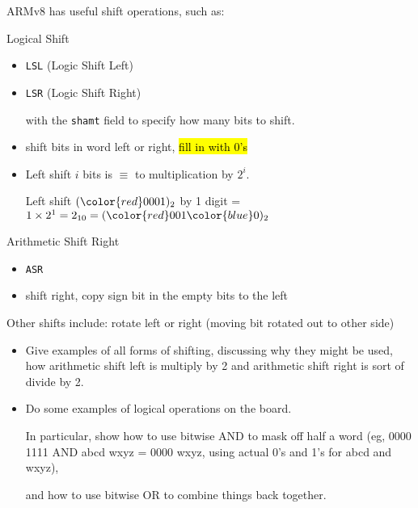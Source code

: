 \begin{frame}[fragile]
ARMv8 has useful shift operations, such as:
\begin{multicols}{2}
Logical Shift 
{\small
\begin{itemize}
\item \texttt{LSL} (Logic Shift Left)
\item \texttt{LSR} (Logic Shift Right)

with the \texttt{shamt} field to specify how many bits to shift.

    \item shift bits in word left or right, \hl{fill in with 0's}
    
\item Left shift $i$ bits is $\equiv$ to multiplication by $2^i$. 

Left shift $({\color{red}0001})_2$ by 1 digit = $ 1 \times 2^1 = 2_{10} =  ({\color{red}001}{\color{blue}0})_2$
\end{itemize}
}
\columnbreak

Arithmetic Shift Right
{\small
\begin{itemize}
\item \texttt{ASR}
\item shift right, copy sign bit in the empty bits to the left 
    \end{itemize}
    }
Other shifts include: rotate left or right (moving bit rotated out to other side)
\end{multicols}


\BNotes\ifnum{}
\begin{itemize}
\item Give examples of all forms of shifting, discussing why they might be
	used, how arithmetic shift left is multiply by 2 and arithmetic
	shift right is sort of divide by 2.
	
\item Do some examples of logical operations on the board.  

	In particular, show how to use
	bitwise AND to mask off half a word 
	(eg, 0000 1111 AND abcd wxyz = 0000 wxyz, using actual 0's and 1's
	for abcd and wxyz),

	and how to use bitwise OR to combine things back together.
\end{itemize}
\fi\ENotes
\end{frame}

